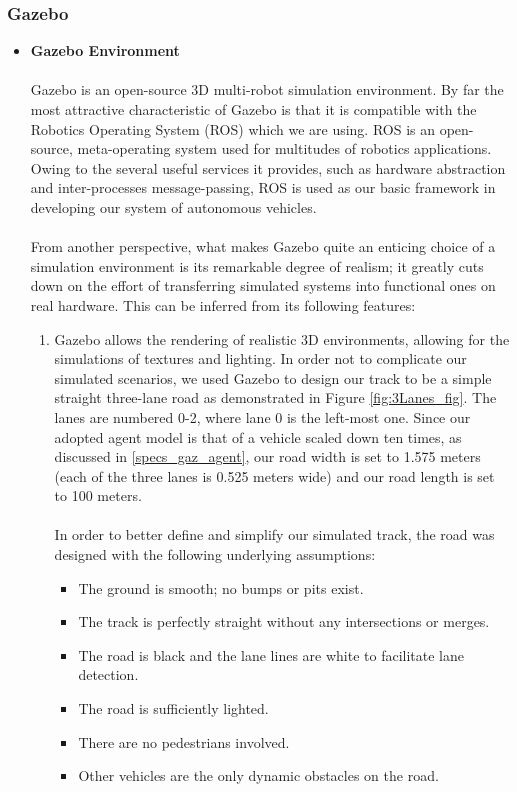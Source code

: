\subsubsection{Gazebo}
\begin{itemize}
    \item \textbf{Gazebo Environment}
    \\ \\ Gazebo is an open-source 3D multi-robot simulation environment\cite{Koenig04designand}. By far the most attractive characteristic of Gazebo is that it is compatible with the Robotics Operating System (ROS) which we are using. ROS is an open-source, meta-operating system used for multitudes of robotics applications\cite{ROSBookMorgan}. Owing to the several useful services it provides, such as hardware abstraction and inter-processes message-passing\cite{ROSBookMorgan}, ROS is used as our basic framework in developing our system of autonomous vehicles. 
    \\ \\From another perspective, what makes Gazebo quite an enticing choice of a simulation environment is its remarkable degree of realism\cite{Koenig04designand}; it greatly cuts down on the effort of transferring simulated systems into functional ones on real hardware. This can be inferred from its following features:

    \begin{enumerate}
        \item Gazebo allows the rendering of realistic 3D environments, allowing for the simulations of textures and lighting\cite{Koenig04designand}. In order not to complicate our simulated scenarios, we used Gazebo to design our track to be a simple straight three-lane road as demonstrated in Figure \ref{fig:3Lanes_fig}. The lanes are numbered 0-2, where lane 0 is the left-most one. Since our adopted agent model is that of a vehicle scaled down ten times, as discussed in \ref{specs_gaz_agent}, our road width is set to 1.575 meters (each of the three lanes is 0.525 meters wide) and our road length is set to 100 meters. 
        \\ \\ In order to better define and simplify our simulated track, the road was designed with the following underlying assumptions:
        \begin{itemize}
            \item The ground is smooth; no bumps or pits exist.
            \item The track is perfectly straight without any intersections or merges.
            \item The road is black and the lane lines are white to facilitate lane detection.
            \item The road is sufficiently lighted.
            \item There are no pedestrians involved.
            \item Other vehicles are the only dynamic obstacles on the road.
        \end{itemize}
        

\end{enumerate}
\end{itemize}
